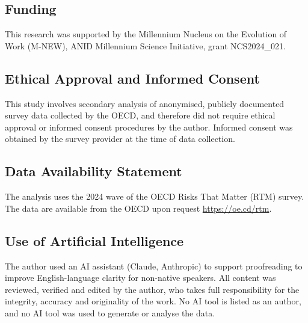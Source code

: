 \documentclass[
  12pt,
  letterpaper,
  DIV=11,
  numbers=noendperiod]{scrartcl}
\begin{document}
\subsection{Funding}\label{funding}

This research was supported by the Millennium Nucleus on the Evolution
of Work (M-NEW), ANID Millennium Science Initiative, grant NCS2024\_021.

\subsection{Ethical Approval and Informed
Consent}\label{ethical-approval-and-informed-consent}

This study involves secondary analysis of anonymised, publicly
documented survey data collected by the OECD, and therefore did not
require ethical approval or informed consent procedures by the author.
Informed consent was obtained by the survey provider at the time of data
collection.

\subsection{Data Availability
Statement}\label{data-availability-statement}

The analysis uses the 2024 wave of the OECD Risks That Matter (RTM)
survey. The data are available from the OECD upon request
\url{https://oe.cd/rtm}.

\subsection{Use of Artificial
Intelligence}\label{use-of-artificial-intelligence}

The author used an AI assistant (Claude, Anthropic) to support
proofreading to improve English-language clarity for non-native
speakers. All content was reviewed, verified and edited by the author,
who takes full responsibility for the integrity, accuracy and
originality of the work. No AI tool is listed as an author, and no AI
tool was used to generate or analyse the data.
\end{document}
